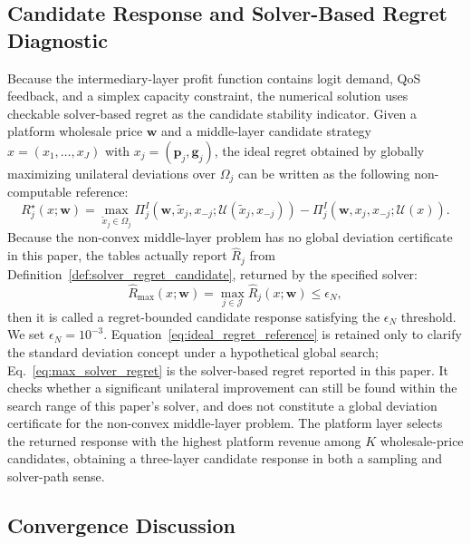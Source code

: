 \documentclass[11pt,a4paper]{article}
\newcommand{\J}{\mathcal{J}}
\newcommand{\w}{\boldsymbol{w}}
\newcommand{\p}{\boldsymbol{p}}
\newcommand{\g}{\boldsymbol{g}}
\begin{document}
\subsection{Candidate Response and Solver-Based Regret Diagnostic}
\label{sec:regret_definition}

Because the intermediary-layer profit function contains logit demand, QoS feedback, and a simplex capacity constraint, the numerical solution uses checkable solver-based regret as the candidate stability indicator. Given a platform wholesale price $\w$ and a middle-layer candidate strategy $x=(x_1,\ldots,x_J)$ with $x_j=(\p_j,\g_j)$, the ideal regret obtained by globally maximizing unilateral deviations over $\Omega_j$ can be written as the following non-computable reference:
\begin{equation}
  R^{\star}_j(x;\w)=
  \max_{\tilde x_j\in\Omega_j}
  \Pi^I_j(\w,\tilde x_j,x_{-j};\mathcal{U}(\tilde x_j,x_{-j}))
  -\Pi^I_j(\w,x_j,x_{-j};\mathcal{U}(x)).
  \label{eq:ideal_regret_reference}
\end{equation}
Because the non-convex middle-layer problem has no global deviation certificate in this paper, the tables actually report $\widehat R_j$ from Definition~\ref{def:solver_regret_candidate}, returned by the specified solver:
\begin{equation}
  \widehat R_{\max}(x;\w)=\max_{j\in\J}\widehat R_j(x;\w)\le \epsilon_N,
  \label{eq:max_solver_regret}
\end{equation}
then it is called a regret-bounded candidate response satisfying the $\epsilon_N$ threshold. We set $\epsilon_N=10^{-3}$. Equation~\eqref{eq:ideal_regret_reference} is retained only to clarify the standard deviation concept under a hypothetical global search; Eq.~\eqref{eq:max_solver_regret} is the solver-based regret reported in this paper. It checks whether a significant unilateral improvement can still be found within the search range of this paper's solver, and does not constitute a global deviation certificate for the non-convex middle-layer problem. The platform layer selects the returned response with the highest platform revenue among $K$ wholesale-price candidates, obtaining a three-layer candidate response in both a sampling and solver-path sense.

\subsection{Convergence Discussion}
\end{document}
